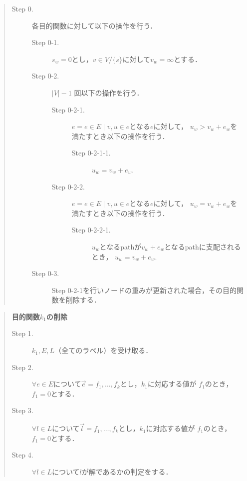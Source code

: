 \documentclass[12pt]{optlab-bachelor}
\begin{document}
\begin{quote}
  \begin{description}
    \item[Step 0.] 各目的関数に対して以下の操作を行う．
    \begin{description}
      \item[Step 0-1.] $s_w = 0$とし，$v \in V/\{s\}$に対して$v_w = \infty$とする．
      \item[Step 0-2.] $|V|-1$ 回以下の操作を行う．
      \begin{description}
        \item[Step 0-2-1.] $e = {e \in E \mid v,u \in e}$となる$e$に対して，
        $u_w > v_w + e_w$を満たすとき以下の操作を行う．
        \begin{description}
          \item[Step 0-2-1-1.] $u_w = v_w + e_w$.
        \end{description}
        \item[Step 0-2-2.] $e = {e \in E \mid v,u \in e}$となる$e$に対して，
        $u_w = v_w + e_w$を満たすとき以下の操作を行う．
        \begin{description}
          \item[Step 0-2-2-1.] $u_w$となるpathが$v_w + e_w$となるpathに支配されるとき，
          $u_w = v_w + e_w$.
        \end{description}
      \end{description}
      \item[Step 0-3.] Step 0-2-1を行いノードの重みが更新された場合，その目的関数を削除する．
    \end{description}
  \end{description}
\end{quote}

\begin{quote}
  \textbf{目的関数$k_1$の削除}
  \begin{description}
    \item[Step 1.] $k_1,E,L$（全てのラベル）を受け取る．
    \item[Step 2.] $\forall e \in E$について$\vec{e}={f_1,\ldots,f_k}$とし，$k_1$に対応する値が
    $f_1$のとき，$f_1=0$とする．
    \item[Step 3.] $\forall l \in L$について$\vec{l}={f_1,\ldots,f_k}$とし，$k_1$に対応する値が
    $f_1$のとき，$f_1=0$とする．
    \item[Step 4.] $\forall l \in L$について$l$が解であるかの判定をする．
  \end{description}
\end{quote}
\end{document}
